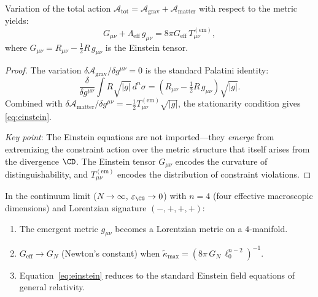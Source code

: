 \begin{theorem}\label{thm:14.8}
Variation of the total action
$\mathcal{A}_{\mathrm{tot}} = \mathcal{A}_{\mathrm{grav}}
+ \mathcal{A}_{\mathrm{matter}}$
with respect to the metric yields:
\begin{equation}\label{eq:einstein}
  \boxed{
  G_{\mu\nu} + \Lambda_{\mathrm{eff}}\,g_{\mu\nu}
  = 8\pi G_{\mathrm{eff}}\,T_{\mu\nu}^{(\mathrm{em})},
  }
\end{equation}
where $G_{\mu\nu} = R_{\mu\nu} - \frac{1}{2}R\,g_{\mu\nu}$ is the
Einstein tensor.
\end{theorem}

\begin{proof}
The variation $\delta\mathcal{A}_{\mathrm{grav}}/\delta g^{\mu\nu} = 0$
is the standard Palatini identity:
\[
  \frac{\delta}{\delta g^{\mu\nu}}\int R\sqrt{|g|}\,d^n\sigma
  = \left(R_{\mu\nu} - \tfrac{1}{2}R\,g_{\mu\nu}\right)\sqrt{|g|}.
\]
Combined with $\delta\mathcal{A}_{\mathrm{matter}}/\delta g^{\mu\nu}
= -\frac{1}{2}T_{\mu\nu}^{(\mathrm{em})}\sqrt{|g|}$, the stationarity
condition gives \eqref{eq:einstein}.

\emph{Key point}: The Einstein equations are not imported---they
\emph{emerge} from extremizing the constraint action over the metric
structure that itself arises from the divergence $\CD$.  The Einstein
tensor $G_{\mu\nu}$ encodes the curvature of distinguishability, and
$T_{\mu\nu}^{(\mathrm{em})}$ encodes the distribution of constraint
violations.
\end{proof}

\begin{corollary}\label{cor:14.3}
In the continuum limit ($N \to \infty$, $\varepsilon_{\CG} \to 0$)
with $n = 4$ (four effective macroscopic dimensions) and Lorentzian
signature $(-,+,+,+)$:
\begin{enumerate}
  \item The emergent metric $g_{\mu\nu}$ becomes a Lorentzian metric
        on a $4$-manifold.
  \item $G_{\mathrm{eff}} \to G_N$ (Newton's constant) when
        $\tilde{\kappa}_{\max} = (8\pi\,G_N\,\ell_0^{n-2})^{-1}$.
  \item Equation~\eqref{eq:einstein} reduces to the standard Einstein
        field equations of general relativity.
\end{enumerate}
\end{corollary}

